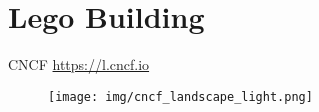 \documentclass{beamer}
\begin{document}
\begin{frame}[fragile]
\begin{columns}
\begin{column}{0.6\textwidth}
  \end{column}
  \end{columns}

\end{frame}

\section{Lego Building}

\begin{frame}{CNCF \textendash \href{https://l.cncf.io}{https://l.cncf.io}}
  \begin{figure}
        \begin{center}
            \texttt{[image: img/cncf\_landscape\_light.png]}
        \end{center}
    \end{figure}
\end{frame}
\end{document}
